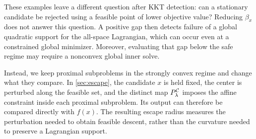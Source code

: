 These examples leave a different question after KKT detection: can a
stationary candidate be rejected using a feasible point of lower objective
value?  Reducing \(\beta_x\) does not answer this question.  A positive gap
then detects failure of a global quadratic support for the all-space
Lagrangian, which can occur even at a constrained global minimizer.
Moreover, evaluating that gap below the safe regime may require a nonconvex
global inner solve.

Instead, we keep proximal subproblems in the strongly convex regime and
change what they compare.  In \cref{sec:escape}, the candidate \(x\) is held
fixed, the center is perturbed along the feasible set, and the distinct map
\(P_\lambda^{\mathcal{C}}\) imposes the affine constraint inside each proximal
subproblem.  Its output can therefore be compared directly with \(f(x)\).
The resulting escape radius measures the perturbation needed to obtain
feasible descent, rather than the curvature needed to preserve a
Lagrangian support.
